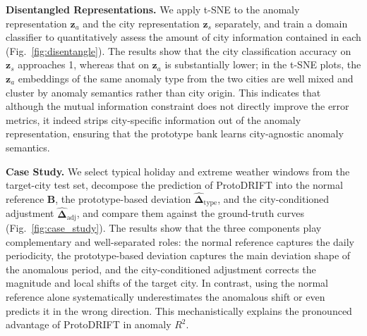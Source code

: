 \textbf{Disentangled Representations.} We apply t-SNE to the anomaly representation $\mathbf{z}_a$ and the city representation $\mathbf{z}_s$ separately, and train a domain classifier to quantitatively assess the amount of city information contained in each (Fig.~\ref{fig:disentangle}). The results show that the city classification accuracy on $\mathbf{z}_s$ approaches 1, whereas that on $\mathbf{z}_a$ is substantially lower; in the t-SNE plots, the $\mathbf{z}_a$ embeddings of the same anomaly type from the two cities are well mixed and cluster by anomaly semantics rather than city origin. This indicates that although the mutual information constraint does not directly improve the error metrics, it indeed strips city-specific information out of the anomaly representation, ensuring that the prototype bank learns city-agnostic anomaly semantics.

\textbf{Case Study.} We select typical holiday and extreme weather windows from the target-city test set, decompose the prediction of ProtoDRIFT into the normal reference $\mathbf{B}$, the prototype-based deviation $\widehat{\boldsymbol{\Delta}}_{\mathrm{type}}$, and the city-conditioned adjustment $\widehat{\boldsymbol{\Delta}}_{\mathrm{adj}}$, and compare them against the ground-truth curves (Fig.~\ref{fig:case_study}). The results show that the three components play complementary and well-separated roles: the normal reference captures the daily periodicity, the prototype-based deviation captures the main deviation shape of the anomalous period, and the city-conditioned adjustment corrects the magnitude and local shifts of the target city. In contrast, using the normal reference alone systematically underestimates the anomalous shift or even predicts it in the wrong direction. This mechanistically explains the pronounced advantage of ProtoDRIFT in anomaly $R^2$.
